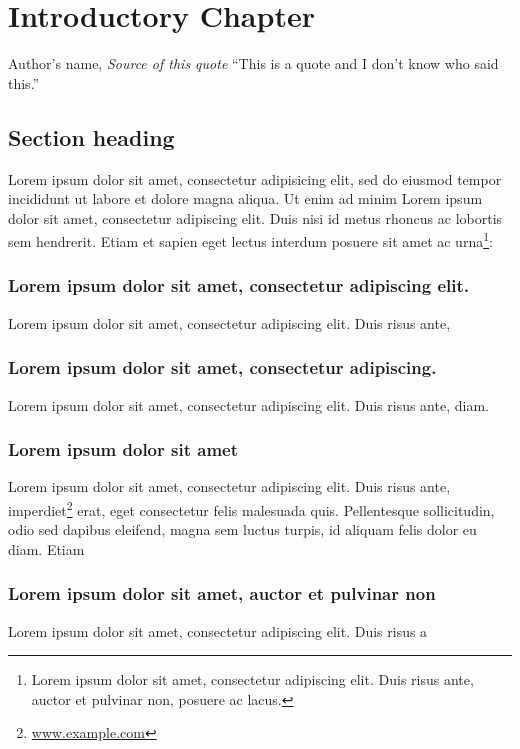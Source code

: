 \chapter{Introductory Chapter}

\begin{chapquote}{Author's name, \textit{Source of this quote}}
	``This is a quote and I don't know who said this.''
\end{chapquote}

\section{Section heading}
Lorem ipsum dolor sit amet, consectetur adipisicing elit, sed do eiusmod tempor incididunt ut labore et dolore magna aliqua. Ut enim ad minim 
\noindent Lorem ipsum dolor sit amet, consectetur adipiscing elit. Duis  nisi id metus rhoncus ac lobortis sem hendrerit. Etiam et sapien eget lectus interdum posuere sit amet ac urna\footnote{Lorem ipsum dolor sit amet, consectetur adipiscing elit. Duis risus ante, auctor et pulvinar non, posuere ac lacus.}:

\subsection{Lorem ipsum dolor sit amet, consectetur adipiscing elit.}
Lorem ipsum dolor sit amet, consectetur adipiscing elit. Duis risus ante, 

\subsection{Lorem ipsum dolor sit amet, consectetur adipiscing.}
Lorem ipsum dolor sit amet, consectetur adipiscing elit. Duis risus ante,  diam.

\subsection{Lorem ipsum dolor sit amet}
Lorem ipsum dolor sit amet, consectetur adipiscing elit. Duis risus ante,  imperdiet\footnote{\url{www.example.com}} erat, eget consectetur felis malesuada quis. Pellentesque sollicitudin, odio sed dapibus eleifend, magna sem luctus turpis, id aliquam felis dolor eu diam. Etiam 

\subsection{Lorem ipsum dolor sit amet, auctor et pulvinar non}
Lorem ipsum dolor sit amet, consectetur adipiscing elit. Duis risus a

